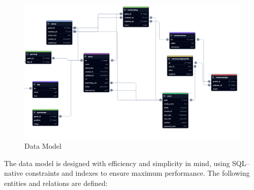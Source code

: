 \documentclass[11pt,italian,a4paper]{article}
\begin{document}
\begin{figure}[H]
    \centering
    \includegraphics[width=\textwidth]{figures/data_model.png}
    \caption{Data Model}
\end{figure}

The data model is designed with efficiency and simplicity in mind, using SQL--native constraints and indexes to ensure maximum performance. The following entities and relations are defined:
\end{document}
